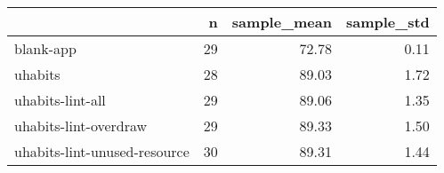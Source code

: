 \begin{tabular}{lrrr}
\toprule
{} &   n &  sample\_mean &  sample\_std \\
\midrule
blank-app                    &  29 &        72.78 &        0.11 \\
uhabits                      &  28 &        89.03 &        1.72 \\
uhabits-lint-all             &  29 &        89.06 &        1.35 \\
uhabits-lint-overdraw        &  29 &        89.33 &        1.50 \\
uhabits-lint-unused-resource &  30 &        89.31 &        1.44 \\
\bottomrule
\end{tabular}
